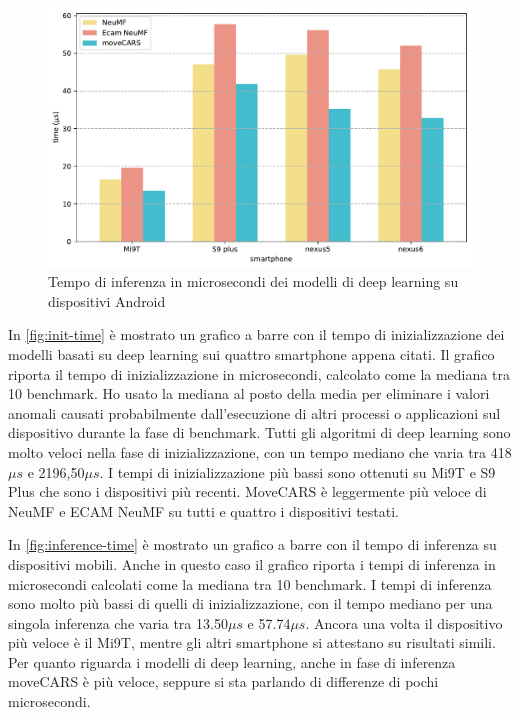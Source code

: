 \documentclass[12pt,italian]{report}
\begin{document}
\begin{figure}
  \centering
  \includegraphics[width=\linewidth]{immagini/inference_tflite.pdf}
  \caption{Tempo di inferenza in microsecondi dei modelli di deep learning su dispositivi Android}
  \label{fig:inference-time}
\end{figure}

\noindent In \autoref{fig:init-time} è mostrato un grafico a barre con il tempo di inizializzazione dei modelli basati su deep learning sui quattro smartphone appena citati. Il grafico riporta il tempo di inizializzazione in microsecondi, calcolato come la mediana tra 10 benchmark. Ho usato la mediana al posto della media per eliminare i valori anomali causati probabilmente dall'esecuzione di altri processi o applicazioni sul dispositivo durante la fase di benchmark. Tutti gli algoritmi di deep learning sono molto veloci nella fase di inizializzazione, con un tempo mediano che varia tra 418$\mu s$ e 2196,50$\mu s$. I tempi di inizializzazione più bassi sono ottenuti su Mi9T e S9 Plus che sono i dispositivi più recenti. MoveCARS è leggermente più veloce di NeuMF e ECAM NeuMF su tutti e quattro i dispositivi testati. 

In \autoref{fig:inference-time} è mostrato un grafico a barre con il tempo di inferenza su dispositivi mobili. Anche in questo caso il grafico riporta i tempi di inferenza in microsecondi calcolati come la mediana tra 10 benchmark. I tempi di inferenza sono molto più bassi di quelli di inizializzazione, con il tempo mediano per una singola inferenza che varia tra 13.50$\mu s$ e 57.74$\mu s$. Ancora una volta il dispositivo più veloce è il Mi9T, mentre gli altri smartphone si attestano su risultati simili. Per quanto riguarda i modelli di deep learning, anche in fase di inferenza moveCARS è più veloce, seppure si sta parlando di differenze di pochi microsecondi. 
\end{document}

